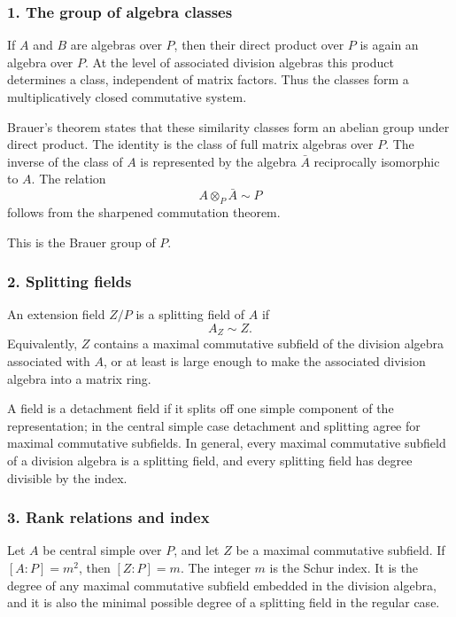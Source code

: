 \documentclass[11pt]{article}
\begin{document}
\subsubsection{1. The group of algebra
classes}\label{the-group-of-algebra-classes}

If \(A\) and \(B\) are algebras over \(P\), then their direct product
over \(P\) is again an algebra over \(P\). At the level of associated
division algebras this product determines a class, independent of matrix
factors. Thus the classes form a multiplicatively closed commutative
system.

Brauer's theorem states that these similarity classes form an abelian
group under direct product. The identity is the class of full matrix
algebras over \(P\). The inverse of the class of \(A\) is represented by
the algebra \(\bar A\) reciprocally isomorphic to \(A\). The relation \[
  A\otimes_P \bar A\sim P
\] follows from the sharpened commutation theorem.

This is the Brauer group of \(P\).

\subsubsection{2. Splitting fields}\label{splitting-fields}

An extension field \(Z/P\) is a splitting field of \(A\) if \[
  A_Z\sim Z.
\] Equivalently, \(Z\) contains a maximal commutative subfield of the
division algebra associated with \(A\), or at least is large enough to
make the associated division algebra into a matrix ring.

A field is a detachment field if it splits off one simple component of
the representation; in the central simple case detachment and splitting
agree for maximal commutative subfields. In general, every maximal
commutative subfield of a division algebra is a splitting field, and
every splitting field has degree divisible by the index.

\subsubsection{3. Rank relations and
index}\label{rank-relations-and-index}

Let \(A\) be central simple over \(P\), and let \(Z\) be a maximal
commutative subfield. If \([A:P]=m^2\), then \([Z:P]=m\). The integer
\(m\) is the Schur index. It is the degree of any maximal commutative
subfield embedded in the division algebra, and it is also the minimal
possible degree of a splitting field in the regular case.
\end{document}
